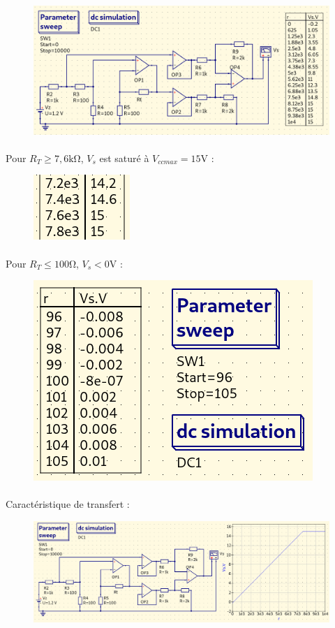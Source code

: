 \documentclass{article}
\begin{document}
\begin{figure}[H]
    \centering
    \includegraphics[width=\linewidth]{./images/cond2-qucs.png}
\end{figure}

\paragraph{}
Pour $R_T \ge 7,6\si{\kilo\ohm}$, $V_s$ est saturé à $V_{cc max} = 15 \si{\volt}$ :
\begin{figure}[H]
    \centering
    \includegraphics[width=0.15\linewidth]{./images/cond2-rtmax.png}
\end{figure}

\paragraph{}
Pour $R_T \le 100\si{\ohm}$, $V_s < 0\si{\volt}$ :
\begin{figure}[H]
    \centering
    \includegraphics[width=0.4\linewidth]{./images/cond2-monotension.png}
\end{figure}

\paragraph{}
Caractéristique de transfert :
\begin{figure}[H]
    \centering
    \includegraphics[width=\linewidth]{./images/cond2-caract-transfert.png}
\end{figure}
\end{document}

